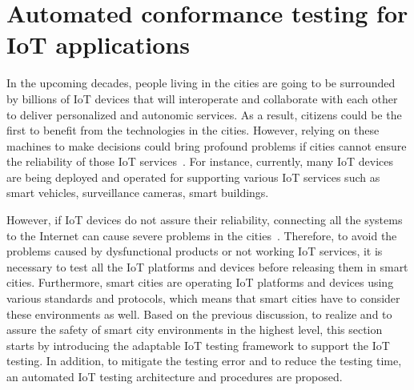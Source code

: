 \section{Automated conformance testing for IoT applications}
\label{sec:smartcity_testing}
In the upcoming decades, people living in the cities are going to be surrounded by billions of IoT devices that will interoperate and collaborate with each other to deliver personalized and autonomic services. As a result, citizens could be the first to benefit from the technologies in the cities. However, relying on these machines to make decisions could bring profound problems if cities cannot ensure the reliability of those IoT services~\cite{loper2017machine}. For instance, currently, many IoT devices are being deployed and operated for supporting various IoT services such as smart vehicles, surveillance cameras, smart buildings.

However, if IoT devices do not assure their reliability, connecting all the systems to the Internet can cause severe problems in the cities~\cite{kaiser2019standards}. Therefore, to avoid the problems caused by dysfunctional products or not working IoT services, it is necessary to test all the IoT platforms and devices before releasing them in smart cities. Furthermore, smart cities are operating IoT platforms and devices using various standards and protocols, which means that smart cities have to consider these environments as well. Based on the previous discussion, to realize and to assure the safety of smart city environments in the highest level, this section starts by introducing the adaptable IoT testing framework to support the IoT testing. In addition, to mitigate the testing error and to reduce the testing time, an automated IoT testing architecture and procedures are proposed.


